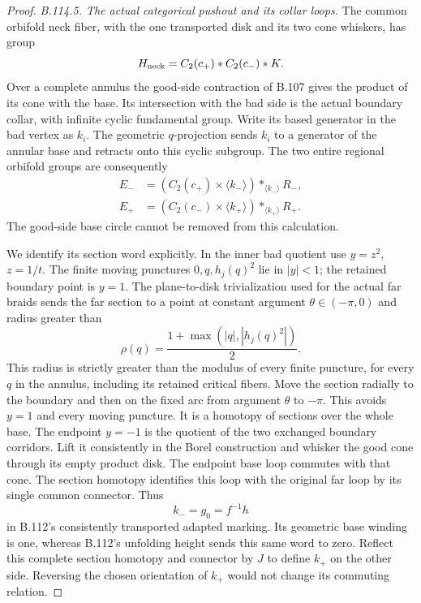 \begin{proof}
\emph{B.114.5. The actual categorical pushout and its collar loops.}
The common orbifold neck fiber, with the one transported disk
and its two cone whiskers, has group
\[
 H_{\rm neck}=C_2(c_+)*C_2(c_-)*K.
\]
Over a complete annulus the good-side contraction of B.107 gives
the product of its cone with the base. Its intersection with the
bad side is the actual boundary collar, with infinite cyclic
fundamental group. Write its based generator in the bad vertex
as $k_i$. The geometric $q$-projection sends $k_i$ to a generator
of the annular base and retracts onto this cyclic subgroup. The
two entire regional orbifold groups are consequently
\begin{equation}\label{eq:B114-regional}
 \begin{aligned}
 E_-&=(C_2(c_+)\times\langle k_-\rangle)
                      *_{\langle k_-\rangle} R_-,\\
 E_+&=(C_2(c_-)\times\langle k_+\rangle)
                      *_{\langle k_+\rangle} R_+.
 \end{aligned}
\end{equation}
The good-side base circle cannot be removed from this calculation.

We identify its section word explicitly. In the inner bad quotient
use $y=z^2$, $z=1/t$. The finite moving punctures
$0,q,h_j(q)^2$ lie in $|y|<1$; the retained boundary point is
$y=1$. The plane-to-disk trivialization used for the actual far
braids sends the far section to a point at constant argument
$\theta\in(-\pi,0)$ and radius greater than
\[
 \rho(q)=\frac{1+\max(|q|,|h_j(q)^2|)}2.
\]
This radius is strictly greater than the modulus of every finite
puncture, for every $q$ in the annulus, including its retained
critical fibers. Move the section radially to the boundary and
then on the fixed arc from argument $\theta$ to $-\pi$.
This avoids $y=1$ and every moving puncture. It is a homotopy of
sections over the whole base. The endpoint $y=-1$ is the quotient
of the two exchanged boundary corridors. Lift it consistently
in the Borel construction and whisker the good cone through its
empty product disk. The endpoint base loop commutes with that
cone. The section homotopy identifies this loop with the original
far loop by its single common connector. Thus
\[
 k_-=g_0=f^{-1}h
\]
in B.112's consistently transported adapted marking. Its geometric
base winding is one, whereas B.112's unfolding height sends this
same word to zero. Reflect this complete section homotopy and
connector by $J$ to define $k_+$ on the other side. Reversing the
chosen orientation of $k_+$ would not change its commuting relation.


\end{proof}
